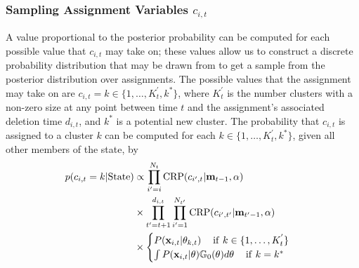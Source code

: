 \documentclass[smallcondensed, final]{svjour3}
\begin{document}

\subsubsection{Sampling Assignment Variables $c_{i,t}$}
\label{sec:sample_assignments}

A value proportional to the posterior probability can be computed for each possible value that $c_{i,t}$ may take on; these values allow us to construct a discrete probability distribution that may be drawn from to get a sample from the posterior distribution over assignments. The possible values that the assignment may take on are $c_{i,t} = k \in \{ 1 , \ldots ,  K_{t}^{'}, k^{*}\}$, where $K_{t}^{'}$ is the number clusters with a non-zero size at any point between time $t$ and the assignment's associated deletion time $d_{i,t}$, and $k^{*}$ is a potential new cluster. The probability that $c_{i,t}$ is assigned to a cluster $k$ can be computed for each $k \in \{ 1 , \ldots ,  K_{t}^{'}, k^{*} \}$, given all other members of the state, by
\begin{equation}
\begin{split}
p(c_{i,t} = k | \text{State}) & \propto
\prod_{i'=i}^{N_{t}}  \text{CRP}(c_{i',t} | \bold{m}_{t-1}, \alpha) \\
& \times \prod_{t' = t+1}^{d_{i,t}}  \prod_{i'=1}^{N_{t'}}   \text{CRP}(c_{i',t'} | \bold{m}_{t'-1}, \alpha) \\
 & \times
\begin{cases}
	P(\bold{x}_{i,t} | \theta_{k,t})                                        \hspace{12pt} \text{if} \hspace{4pt} k \in \{ 1, \ldots, K_{t}^{'} \} \\
	\int P(\bold{x}_{i,t} | \theta) \mathbb{G}_{0}(\theta) d\theta    \hspace{12pt} \text{if}  \hspace{4pt}  k = k^{*}
\end{cases}
\end{split}
\end{equation}
\end{document}
